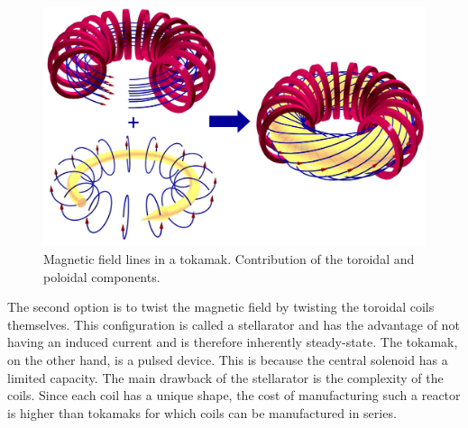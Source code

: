 \begin{figure}[h]
    \includegraphics[width=\linewidth]{Figures/Chapter1/tokamak_magnetic_fields.png}
    \caption{Magnetic field lines in a tokamak. Contribution of the toroidal and poloidal components.}
\end{figure}

The second option is to twist the magnetic field by twisting the toroidal coils themselves.
This configuration is called a \gls{stellarator} and has the advantage of not having an induced current and is therefore inherently steady-state.
The \gls{tokamak}, on the other hand, is a pulsed device.
This is because the central solenoid has a limited capacity.
The main drawback of the \gls{stellarator} is the complexity of the coils.
Since each coil has a unique shape, the cost of manufacturing such a reactor is higher than \glspl{tokamak} for which coils can be manufactured in series.

